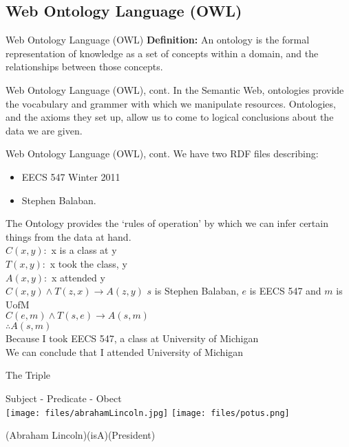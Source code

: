 \documentclass{beamer}
\begin{document}
\subsection[OWL]{Web Ontology Language (OWL)}
\begin{frame}{Web Ontology Language (OWL)}
\textbf{Definition:}
An ontology is the formal representation of knowledge as a set of concepts within a domain, and the relationships between those concepts.
\end{frame}
\begin{frame}{Web Ontology Language (OWL), cont.}
In the Semantic Web, ontologies provide the vocabulary and grammer with which we manipulate resources. Ontologies, and the axioms they set up, allow us to come to logical conclusions about the data we are given.
\end{frame}
\begin{frame}{Web Ontology Language (OWL), cont.}
We have two RDF files describing: 
\begin{itemize}
\item EECS 547 Winter 2011
\item Stephen Balaban.
\end{itemize}
\pause
The Ontology provides the `rules of operation' by which we can infer certain 
things from the data at hand.\\
\pause
\vspace{0.25cm}
{\tiny
$C(x,y):$ x is a class at y\\
$T(x,y):$ x took the class, y\\
$A(x,y):$ x attended y\\
$C(x,y) \land T(z,x) \rightarrow A(z,y)$
$s$ is Stephen Balaban, $e$ is EECS 547 and $m$ is UofM\\
$C(e,m) \land T(s,e) \rightarrow A(s,m)$\\
$\therefore A(s,m)$\\
}
\vspace{0.25cm}
Because I took EECS 547, a class at University of Michigan\\
We can conclude that I attended University of Michigan\\
\end{frame}

\begin{frame}{The Triple}
\begin{center}
{\Huge Subject - Predicate - Obect }\\
\vspace{10pt}
\texttt{[image: files/abrahamLincoln.jpg]}
\hspace{30pt}\raisebox{60pt}{\Huge =}\hspace{30pt}
\texttt{[image: files/potus.png]}\\
\end{center}
\hspace{18pt}(Abraham Lincoln)\hspace{35pt}(isA)\hspace{60pt}(President)\\
\begin{center}
\end{center}
\end{frame}
\end{document}
